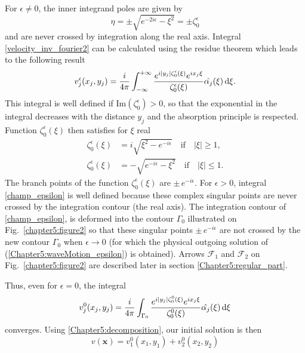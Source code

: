 For  $\epsilon \neq 0$, the inner integrand poles are given by
\begin{equation}
 \eta = \pm \sqrt{e^{-2i\epsilon} - \xi^2}  = \pm \zeta_0^\epsilon
\end{equation} 
and are never crossed by integration along the real axis. Integral \eqref{velocity_inv_fourier2} can be calculated using the residue theorem which leads to the following result
\begin{equation}
\label{champ_epsilon}
v_j^\epsilon(x_j,y_j) = \dfrac{i}{4\pi} \int_{-\infty}^{+\infty}  \dfrac{e^{i|y_j|\zeta_0^\epsilon(\xi)} e^{i x_j \xi}}{\zeta_0^\epsilon(\xi)} \hat{\alpha_j}(\xi) \, {\rm d}\xi.
\end{equation}
This integral is well defined if $\text{Im}(\zeta_0^\epsilon) > 0$, so that the exponential in the integral decreases with the distance $y_j$ and the absorption principle is respected. Function $\zeta_0^\epsilon(\xi)$ then satisfies for $\xi$ real
\begin{subequations}
\label{zeta_function}
\begin{align}
\zeta_0^\epsilon(\xi)&= i\sqrt{\xi^2-e^{-i\epsilon}} \quad \text{if} \quad \vert \xi\vert \geq 1,\\
\label{zeta_function_inferior1}
\zeta_0^\epsilon(\xi)&= -\sqrt{e^{-i\epsilon}-\xi^2} \quad  \text{if} \quad \vert \xi\vert \leq 1.
\end{align}
\end{subequations}
The branch points of the function $\zeta_0^\epsilon(\xi)$ are $\pm  \, e^{-i\epsilon}$. For $\epsilon > 0$, integral \eqref{champ_epsilon} is well defined because these complex singular points are never crossed by the integration contour (the real axis). The integration contour of \eqref{champ_epsilon}, is deformed into the contour $\Gamma_0$ illustrated on Fig.~\ref{chapter5:figure2} so that these singular points $\pm  \, e^{-i\epsilon}$ are not crossed by the new contour $\Gamma_0$  when $\epsilon \rightarrow 0$ (for which the physical outgoing solution of (\ref{Chapter5:waveMotion_epsilon}) is obtained). Arrows $\mathcal{F}_1$ and $\mathcal{F}_2$ on Fig.~\ref{chapter5:figure2} are described later in section \ref{Chapter5:regular_part}.

Thus, even for $\epsilon=0$, the integral
\begin{equation}
\label{champ}
v_j^0(x_j,y_j) = \dfrac{i}{4\pi} \int_{\Gamma_0}  \dfrac{e^{i|y_j|\zeta_0^0(\xi)} e^{i x_j \xi}}{\zeta_0^0(\xi)} \hat{\alpha_j}(\xi)  \, {\rm d}\xi
\end{equation}
converges.
Using \eqref{Chapter5:decomposition}, our initial solution is then
\begin{equation}
\label{initial_sol}
v(\mathbf{x}) = v_1^0(x_1,y_1) + v_2^0(x_2,y_2)
\end{equation}

